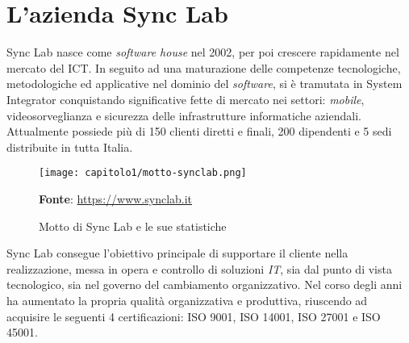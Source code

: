 
\section{L'azienda Sync Lab}
Sync Lab nasce come \textit{software house} nel 2002, per poi crescere rapidamente nel mercato del \gls{ICT}. In seguito ad una maturazione delle competenze tecnologiche, metodologiche ed applicative nel dominio del \textit{software}, si è tramutata in \gls{System Integrator} conquistando significative fette di mercato nei settori: \textit{mobile}, videosorveglianza e sicurezza delle infrastrutture informatiche aziendali. Attualmente possiede più di 150 clienti diretti e finali, 200 dipendenti e 5 sedi distribuite in tutta Italia. 

\begin{figure}[!h]
  \centering
  \texttt{[image: capitolo1/motto-synclab.png]}
  \caption{Motto di Sync Lab e le sue statistiche}
  \textbf{Fonte}: \href{https://www.synclab.it}{https://www.synclab.it}
\end{figure}

Sync Lab consegue l'obiettivo principale di supportare il cliente nella realizzazione, messa in opera e controllo di soluzioni \textit{IT}, sia dal punto di vista tecnologico, sia nel governo del cambiamento organizzativo. Nel corso degli anni ha aumentato la propria qualità organizzativa e produttiva, riuscendo ad acquisire le seguenti 4 certificazioni: ISO 9001, ISO 14001, ISO 27001 e ISO 45001.




